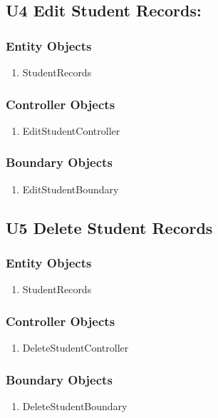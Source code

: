 \documentclass{scrreprt}
\begin{document}
\subsection{U4 Edit Student Records:}
\subsubsection{Entity Objects}
\begin{enumerate}
  \item StudentRecords
\end{enumerate}
\subsubsection{Controller Objects}
\begin{enumerate}
  \item EditStudentController
\end{enumerate}
\subsubsection{Boundary Objects}
\begin{enumerate}
  \item EditStudentBoundary
\end{enumerate}
\subsection{U5 Delete Student Records}
\subsubsection{Entity Objects}
\begin{enumerate}
  \item StudentRecords
\end{enumerate}
\subsubsection{Controller Objects}
\begin{enumerate}
  \item DeleteStudentController
\end{enumerate}
\subsubsection{Boundary Objects}
\begin{enumerate}
  \item DeleteStudentBoundary
\end{enumerate}
\end{document}
